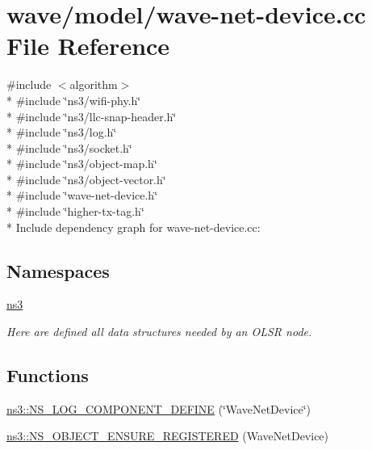 \hypertarget{wave-net-device_8cc}{}\section{wave/model/wave-\/net-\/device.cc File Reference}
\label{wave-net-device_8cc}
{\ttfamily \#include $<$algorithm$>$}\\*
{\ttfamily \#include \char`\"{}ns3/wifi-\/phy.\+h\char`\"{}}\\*
{\ttfamily \#include \char`\"{}ns3/llc-\/snap-\/header.\+h\char`\"{}}\\*
{\ttfamily \#include \char`\"{}ns3/log.\+h\char`\"{}}\\*
{\ttfamily \#include \char`\"{}ns3/socket.\+h\char`\"{}}\\*
{\ttfamily \#include \char`\"{}ns3/object-\/map.\+h\char`\"{}}\\*
{\ttfamily \#include \char`\"{}ns3/object-\/vector.\+h\char`\"{}}\\*
{\ttfamily \#include \char`\"{}wave-\/net-\/device.\+h\char`\"{}}\\*
{\ttfamily \#include \char`\"{}higher-\/tx-\/tag.\+h\char`\"{}}\\*
Include dependency graph for wave-\/net-\/device.cc\+:
\subsection*{Namespaces}
\begin{DoxyCompactItemize}
\item 
 \hyperlink{namespacens3}{ns3}
\begin{DoxyCompactList}\small\item\em Here are defined all data structures needed by an O\+L\+SR node. \end{DoxyCompactList}\end{DoxyCompactItemize}
\subsection*{Functions}
\begin{DoxyCompactItemize}
\item 
\hyperlink{namespacens3_ab7488b4fd8688647c2c630c1ab079c35}{ns3\+::\+N\+S\+\_\+\+L\+O\+G\+\_\+\+C\+O\+M\+P\+O\+N\+E\+N\+T\+\_\+\+D\+E\+F\+I\+NE} (\char`\"{}Wave\+Net\+Device\char`\"{})
\item 
\hyperlink{namespacens3_ad40071b1d80c27d915d13b0f914623a5}{ns3\+::\+N\+S\+\_\+\+O\+B\+J\+E\+C\+T\+\_\+\+E\+N\+S\+U\+R\+E\+\_\+\+R\+E\+G\+I\+S\+T\+E\+R\+ED} (Wave\+Net\+Device)
\end{DoxyCompactItemize}
